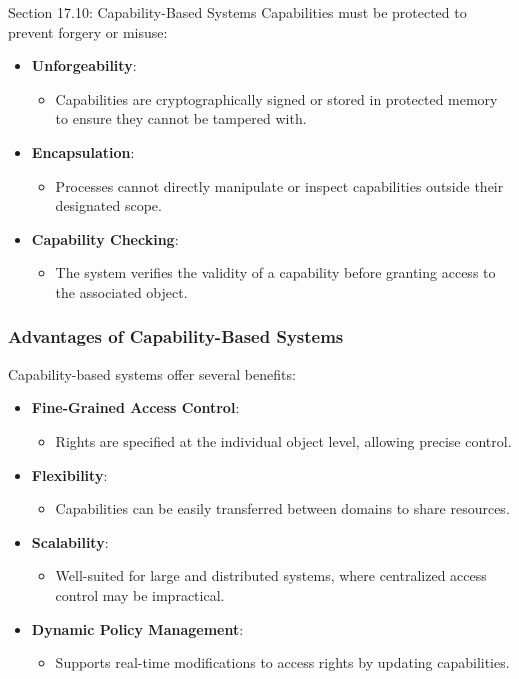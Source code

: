\begin{notes}{Section 17.10: Capability-Based Systems}
    Capabilities must be protected to prevent forgery or misuse:
    \begin{itemize}
        \item \textbf{Unforgeability}:
        \begin{itemize}
            \item Capabilities are cryptographically signed or stored in protected memory to ensure they cannot be tampered with.
        \end{itemize}
        \item \textbf{Encapsulation}:
        \begin{itemize}
            \item Processes cannot directly manipulate or inspect capabilities outside their designated scope.
        \end{itemize}
        \item \textbf{Capability Checking}:
        \begin{itemize}
            \item The system verifies the validity of a capability before granting access to the associated object.
        \end{itemize}
    \end{itemize}
    
    \subsubsection*{Advantages of Capability-Based Systems}
    
    Capability-based systems offer several benefits:
    \begin{itemize}
        \item \textbf{Fine-Grained Access Control}:
        \begin{itemize}
            \item Rights are specified at the individual object level, allowing precise control.
        \end{itemize}
        \item \textbf{Flexibility}:
        \begin{itemize}
            \item Capabilities can be easily transferred between domains to share resources.
        \end{itemize}
        \item \textbf{Scalability}:
        \begin{itemize}
            \item Well-suited for large and distributed systems, where centralized access control may be impractical.
        \end{itemize}
        \item \textbf{Dynamic Policy Management}:
        \begin{itemize}
            \item Supports real-time modifications to access rights by updating capabilities.
        \end{itemize}
    \end{itemize}
    

\end{notes}
